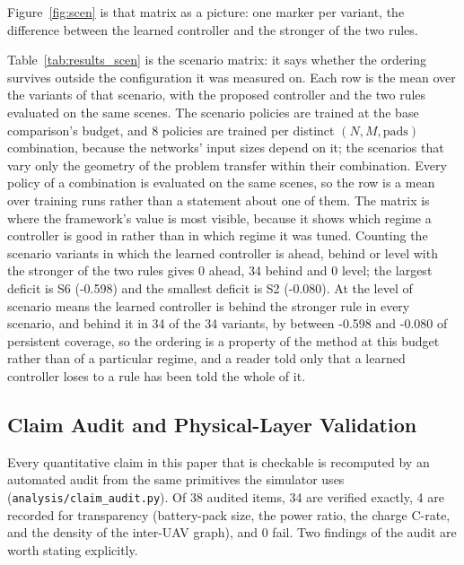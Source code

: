 \documentclass[conference]{IEEEtran}
\newcommand{\tokAuditFail}{0}
\newcommand{\tokAuditInfo}{4}
\newcommand{\tokAuditItems}{38}
\newcommand{\tokAuditPass}{34}
\begin{document}
Figure~\ref{fig:scen} is that matrix as a picture: one marker per variant, the difference between the learned controller and the stronger of the two rules.

Table~\ref{tab:results_scen} is the scenario matrix: it says whether the ordering survives outside the configuration it was measured on. Each row is the mean over the variants of that scenario, with the proposed
controller and the two rules evaluated on the same scenes.  The scenario
policies are trained at the base comparison's budget, and
8 policies are trained per distinct $(N, M, \text{pads})$ combination, because
the networks' input sizes depend on it; the scenarios that vary only the
geometry of the problem transfer within their combination.  Every policy
of a combination is evaluated on the same scenes, so the row is a mean
over training runs rather than a statement about one of them.  The matrix is
where the framework's value is most visible, because it shows
which regime a controller is good in rather than in which regime it was
tuned.  Counting the scenario variants in which the learned controller is
ahead, behind or level with the stronger of the two rules gives
0 ahead,
34 behind and 0 level; the largest deficit is
S6 (-0.598) and the smallest deficit is S2 (-0.080).  At the level of scenario means the learned controller is behind the stronger rule in every scenario, and behind it in 34 of the 34 variants, by between -0.598 and -0.080 of persistent coverage, so the ordering is a property of the method at this budget rather than of a particular regime, and a reader told only that a learned controller loses to a rule has been told the whole of it.

\subsection{Claim Audit and Physical-Layer Validation}
\label{sec:validation}

Every quantitative claim in this paper that is checkable is recomputed by an
automated audit from the same primitives the simulator uses
(\texttt{analysis/claim\_audit.py}). Of \tokAuditItems{} audited items,
\tokAuditPass{} are verified exactly, \tokAuditInfo{} are recorded for
transparency (battery-pack size, the power ratio, the charge C-rate, and the
density of the inter-UAV graph), and $\tokAuditFail{}$ fail. Two findings of the
audit are worth stating explicitly.
\end{document}
